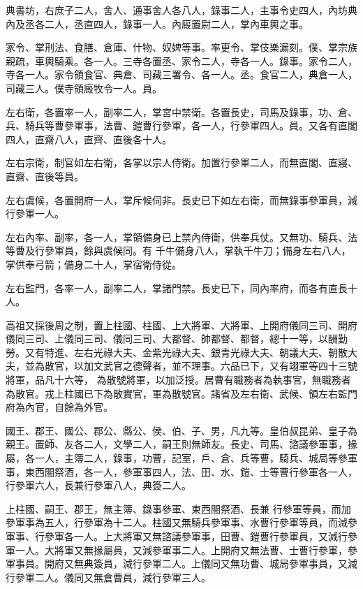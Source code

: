 \begin{pinyinscope}
 典書坊，右庶子二人，舍人、通事舍人各八人，錄事二人，主事令史四人，內坊典內及丞各二人，丞直四人，錄事一人。內廄置尉二人，掌內車輿之事。



 家令、掌刑法、食膳、倉庫、什物、奴婢等事。率更令、掌伎樂漏刻。僕、掌宗族親疏，車輿騎乘。各一人。三寺各置丞、家令二人，寺各一人。錄事。家令二人，寺各一人。家令領食官、典倉、司藏三署令、各一人。丞。食官二人，典倉一人，司藏三人。僕寺領廄牧令一人。員。



 左右衛，各置率一人，副率二人，掌宮中禁衛。各置長史，司馬及錄事，功、倉、兵、騎兵等曹參軍事，法曹、鎧曹行參軍，各一人，行參軍四人。員。又各有直閣四人，直齋八人，直齊、直後各十人。



 左右宗衛，制官如左右衛，各掌以宗人侍衛。加置行參軍二人，而無直閣、直寢、直齋、直後等員。



 左右虞候，各置開府一人，掌斥候伺非。長史已下如左右衛，而無錄事參軍員，減行參軍一人。



 左右內率、副率，各一人，掌領備身已上禁內侍衛，供奉兵仗。又無功、騎兵、法等曹及行參軍員，餘與虞候同。有
 千牛備身八人，掌執千牛刀；備身左右八人，掌供奉弓箭；備身二十人，掌宿衛侍從。



 左右監門，各率一人，副率二人，掌諸門禁。長史已下，同內率府，而各有直長十人。



 高祖又採後周之制，置上柱國、柱國、上大將軍、大將軍、上開府儀同三司、開府儀同三司、上儀同三司、儀同三司、大都督、帥都督、都督，總十一等，以酬勤勞。又有特進、左右光祿大夫、金紫光祿大夫、銀青光祿大夫、朝議大夫、朝散大夫，並為散官，以加文武官之德聲者，並不理事。六品已下，又有翊軍等四十三號將軍，品凡十六等，
 為散號將軍，以加泛授。居曹有職務者為執事官，無職務者為散官。戎上柱國已下為散實官，軍為散號官。諸省及左右衛、武候、領左右監門府為內官，自餘為外官。



 國王、郡王、國公、郡公、縣公、侯、伯、子、男，凡九等。皇伯叔昆弟、皇子為親王。置師、友各二人，文學二人，嗣王則無師友。長史、司馬、諮議參軍事，掾屬，各一人，主簿二人，錄事，功曹，記室，戶、倉、兵等曹，騎兵、城局等參軍事，東西閤祭酒，各一人，參軍事四人，法、田、水、鎧、士等曹行參軍各一人，行參軍六人，長兼行參軍八人，典簽二人。



 上柱國、嗣王、郡王，無主簿、錄事參軍、東西閤祭酒、長兼
 行參軍等員，而加參軍事為五人，行參軍為十二人。柱國又無騎兵參軍事、水曹行參軍等員，而減參軍事、行參軍各一人。上大將軍又無諮議參軍事，田曹、鎧曹行參軍員，又減行參軍一人。大將軍又無掾屬員，又減參軍事二人。上開府又無法曹、士曹行參軍，參軍事員。開府又無典簽員，減行參軍二人。上儀同又無功曹、城局參軍事員，又減行參軍二人。儀同又無倉曹員，減行參軍三人。




\end{pinyinscope}
